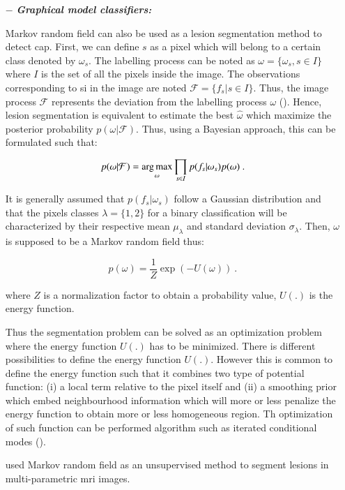 \begin{enumerate}[leftmargin=*]
\item[$-$] \textbf{\textit{Graphical model classifiers:}}

Markov random field can also be used as a lesion segmentation method to detect \ac{cap}. First, we can define $s$ as a pixel which will belong to a certain class denoted by $\omega_s$. The labelling process can be noted as $\omega = \{\omega_s, s \in I\}$ where $I$ is the set of all the pixels inside the image. The observations corresponding to \ac{si} in the image are noted $\mathcal{F} = \{ f_s | s \in I \}$. Thus, the image process $\mathcal{F}$ represents the deviation from the labelling process $\omega$ (\cite{Kato2001}). Hence, lesion segmentation is equivalent to estimate the best $\hat{\omega}$ which maximize the posterior probability $p(\omega|\mathcal{F})$. Thus, using a Bayesian approach, this can be formulated such that:

\begin{equation}
	p(\omega|\mathcal{F}) = \operatorname*{arg\,max}_{\omega} \prod_{s \in I} p(f_s | \omega_s) p(\omega) \ .
	\label{eq:mrf1}
\end{equation}

It is generally assumed that $p(f_s | \omega_s)$ follow a Gaussian distribution and that the pixels classes $\lambda = \{1,2\}$ for a binary classification will be characterized by their respective mean $\mu_{\lambda}$ and standard deviation $\sigma_{\lambda}$. Then, $\omega$ is supposed to be a Markov random field thus:

\begin{equation}
	p(\omega) =  \frac{1}{Z} \exp\left( -U(\omega) \right)  \ .
	\label{eq:mrf2}
\end{equation}

\noindent where $Z$ is a normalization factor to obtain a probability value, $U(.)$ is the energy function.

Thus the segmentation problem can be solved as an optimization problem where the energy function $U(.)$ has to be minimized. There is different possibilities to define the energy function $U(.)$. However this is common to define the energy function such that it combines two type of potential function: (i) a local term relative to the pixel itself and (ii) a smoothing prior which embed neighbourhood information which will more or less penalize the energy function to obtain more or less homogeneous region. Th optimization of such function can be performed algorithm such as iterated conditional modes (\cite{Kato2001}).

\cite{Liu2009,Ozer2010} used Markov random field as an unsupervised method to segment lesions in multi-parametric \ac{mri} images.


\end{enumerate}
